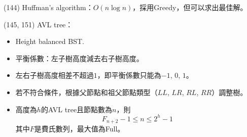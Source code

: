 \item \begin{theorem}{(144)} Huffman's algorithm：$O(n\log n)$，採用Greedy，但可以求出最佳解。
\end{theorem}

\item \begin{theorem}{(145, 151)} AVL tree： \label{avltree}\begin{itemize}
        \item Height balanced BST.
        \item 平衡係數：左子樹高度減去右子樹高度。
        \item 左右子樹高度相差不超過$1$，即平衡係數只能為$-1$, $0$, $1$。
        \item 若不符合條件，根據父節點和祖父節點類型（$LL$, $LR$, $RL$, $RR$）調整樹。
        \item 高度為$h$的AVL tree且節點數為$n$，則\begin{equation}
            F_{n + 2} - 1 \le n \le 2^h - 1
        \end{equation} 其中$F$是費氏數列，最大值為Full。 
    \end{itemize}
\end{theorem}

